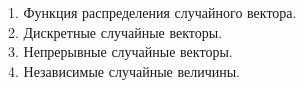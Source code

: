 
1. Функция распределения случайного вектора. \\


2. Дискретные случайные векторы. \\


3. Непрерывные случайные векторы. \\


4. Независимые случайные величины. \\
